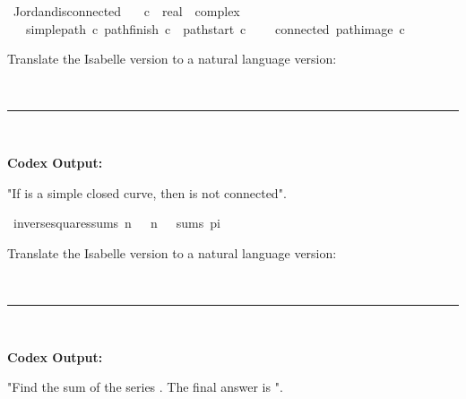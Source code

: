 \documentclass{article}
\begin{document}
\begin{boxB}
\begin{isabelle}
\isamarkupfalse \ Jordan{\isacharunderscore}{\kern0pt}disconnected{\isacharcolon}{\kern0pt}\isanewline
\ \ \ c\ {\isacharcolon}{\kern0pt}{\isacharcolon}{\kern0pt}\ {\isachardoublequoteopen}real\ {\isasymRightarrow}\ complex{\isachardoublequoteclose}\isanewline
\ \ \ {\isachardoublequoteopen}simple{\isacharunderscore}{\kern0pt}path\ c{\isachardoublequoteclose}\ {\isachardoublequoteopen}pathfinish\ c\ {\isacharequal}{\kern0pt}\ pathstart\ c{\isachardoublequoteclose}\isanewline
\ \ \ {\isachardoublequoteopen}{\isasymnot}\ connected{\isacharparenleft}{\kern0pt}{\isacharminus}{\kern0pt}\ path{\isacharunderscore}{\kern0pt}image\ c{\isacharparenright}{\kern0pt}{\isachardoublequoteclose}
\end{isabelle}

Translate the Isabelle version to a natural language version:

\
\hrule
\

\textbf{Codex Output:}

"If  is a simple closed curve, then  is not connected".
\end{boxB}

\begin{boxB}
\begin{isabelle}
\isamarkupfalse \ inverse{\isacharunderscore}{\kern0pt}squares{\isacharunderscore}{\kern0pt}sums{\isacharcolon}{\kern0pt}\ {\isachardoublequoteopen}{\isacharparenleft}{\kern0pt}{\isasymlambda}n{\isachardot}{\kern0pt}\ {}\ {\isacharslash}{\kern0pt}\ {\isacharparenleft}{\kern0pt}n\ {\isacharplus}{\kern0pt}\ {}{\isacharparenright}{\kern0pt}\ sums\ {\isacharparenleft}{\kern0pt}pi\ {\isacharslash}{\kern0pt}\ {}{\isacharparenright}{\kern0pt}{\isachardoublequoteclose}
\end{isabelle}
Translate the Isabelle version to a natural language version:

\
\hrule
\

\textbf{Codex Output:}

"Find the sum of the series . The final answer is ".
\end{boxB}
\end{document}
